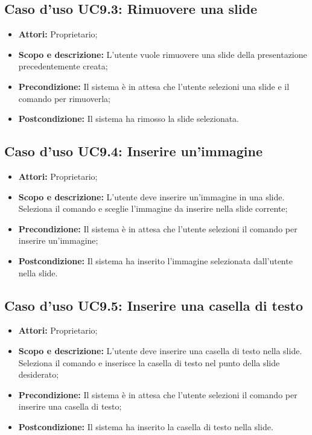 \subsection{Caso d'uso UC9.3: Rimuovere una \gls{slide}}
\begin{itemize}
	\item \textbf{Attori:} Proprietario;
	\item \textbf{Scopo e descrizione:} L'utente vuole rimuovere una \gls{slide} della presentazione precedentemente creata;
	\item \textbf{Precondizione:} Il sistema è in attesa che l'utente selezioni una \gls{slide} e il comando per rimuoverla;
	\item \textbf{Postcondizione:} Il sistema ha rimosso la \gls{slide} selezionata.
\end{itemize}


\subsection{Caso d'uso UC9.4: Inserire un'immagine}
\begin{itemize}
\item \textbf{Attori:} Proprietario;
\item \textbf{Scopo e descrizione:} L'utente deve inserire un'immagine in una \gls{slide}. Seleziona il comando e sceglie l'immagine da inserire nella \gls{slide} corrente;
\item \textbf{Precondizione:} Il sistema è in attesa che l'utente selezioni il comando per inserire un'immagine;
\item \textbf{Postcondizione:} Il sistema ha inserito l'immagine selezionata dall'utente nella \gls{slide}.
\end{itemize}


\subsection{Caso d'uso UC9.5: Inserire una casella di testo}
\begin{itemize}
\item \textbf{Attori:} Proprietario;
\item \textbf{Scopo e descrizione:} L'utente deve inserire una casella di testo nella \gls{slide}. Seleziona il comando e inserisce la casella di testo nel punto della \gls{slide} desiderato;
\item \textbf{Precondizione:} Il sistema è in attesa che l'utente selezioni il comando per inserire una casella di testo;
\item \textbf{Postcondizione:} Il sistema ha inserito la casella di testo nella \gls{slide}.
\end{itemize}


